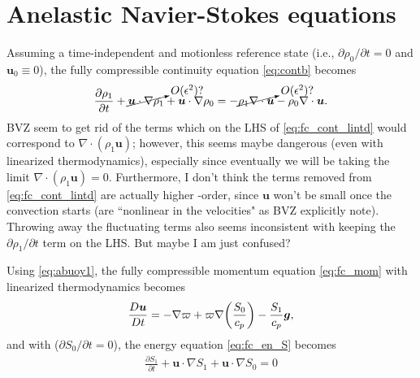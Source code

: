 \documentclass[12pt]{article} %
\newcommand{\pderiv}[2]{\frac{\partial#1}{\partial#2}}
\newcommand{\pomega}{\varpi}
\newcommand{\ugrad}{\bm{u}\cdot\nabla}
\begin{document}
	\section{Anelastic Navier-Stokes equations}
	Assuming a time-independent and motionless reference state (i.e., $\partial\rho_0/\partial t=0$ and $\bm{u}_0\equiv 0$), the fully compressible continuity equation \eqref{eq:contb} becomes
	\begin{align}
	\pderiv{\rho_1}{t} + \cancelto{O(\epsilon^2)?}{\ugrad\rho_1}+ \ugrad\rho_0 = -\cancelto{O(\epsilon^2)?}{\rho_1\nabla\cdot\bm{u}} -\rho_0\nabla\cdot\bm{u}.
	\label{eq:fc_cont_lintd}
	\end{align}
	BVZ seem to get rid of the terms which on the LHS of \eqref{eq:fc_cont_lintd} would correspond to $\nabla\cdot(\rho_1\bm{u})$; however, this seems maybe dangerous (even with linearized thermodynamics), especially since eventually we will be taking the limit $\nabla\cdot(\rho_1\bm{u})=0$. Furthermore, I don't think the terms removed from \eqref{eq:fc_cont_lintd} are actually higher -order, since $\bm{u}$ won't be small once the convection starts (are ``nonlinear in the velocities" as BVZ explicitly note). Throwing away the fluctuating terms also seems inconsistent with keeping the $\partial\rho_1/\partial t$ term on the LHS. But maybe I am just confused?
	
	Using \eqref{eq:abuoy1}, the fully compressible momentum equation \eqref{eq:fc_mom} with linearized thermodynamics becomes 
	\begin{align}
	\frac{D\bm{u}}{Dt} = -\nabla\pomega + \pomega\nabla\bigg{(}\frac{S_0}{c_p}\bigg{)} - \frac{S_1}{c_p}\bm{g},
	\label{eq:fc_mom_lintd}
	\end{align}
	and with ($\partial S_0/\partial t =0$), the energy equation \eqref{eq:fc_en_S} becomes
	\begin{align}
	\pderiv{S_1}{t} + \ugrad S_1 + \ugrad S_0 = 0
	\label{eq:fc_en_lintd}
	\end{align}
	
\end{document}
